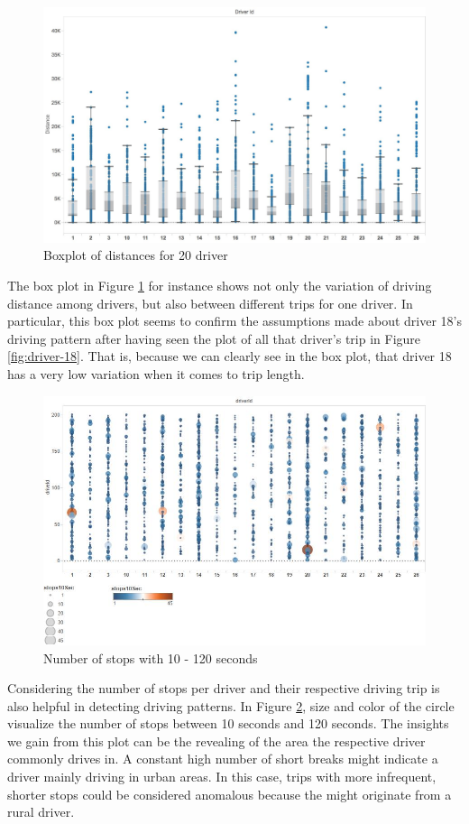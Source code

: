 \documentclass{vldb}
\begin{document}
\begin{figure}
\centering
\includegraphics[width=\linewidth]{"pics/box-plot-distance"}%
\caption{Boxplot of distances for 20 driver}
\label{fig:box-plot-distance}
\end{figure}
The box plot in Figure \ref{fig:box-plot-distance} for instance shows not only the variation of driving distance among drivers, but also between different trips for one driver.  In particular, this box plot seems to confirm the assumptions made about driver 18's driving pattern after having seen the plot of all that driver's trip in Figure \ref{fig:driver-18}. That is, because we can clearly see in the box plot, that driver 18 has a very low variation when it comes to trip length. 

\begin{figure}
\centering
\includegraphics[width=\linewidth]{"pics/number-of-breaks-10-120"}%
\caption{Number of stops with 10 - 120 seconds}
\label{fig:number-of-breaks-10-120}
\end{figure}
Considering the number of stops per driver and their respective driving trip is also helpful in detecting driving patterns. In Figure \ref{fig:number-of-breaks-10-120}, size and color of the circle visualize the number of stops between 10 seconds and 120 seconds. The insights we gain from this plot can be the revealing of the area the respective driver commonly drives in. A constant high number of short breaks might indicate a driver mainly driving in urban areas. In this case, trips with more infrequent, shorter stops could be considered anomalous because the might originate from a rural driver.
\end{document}
